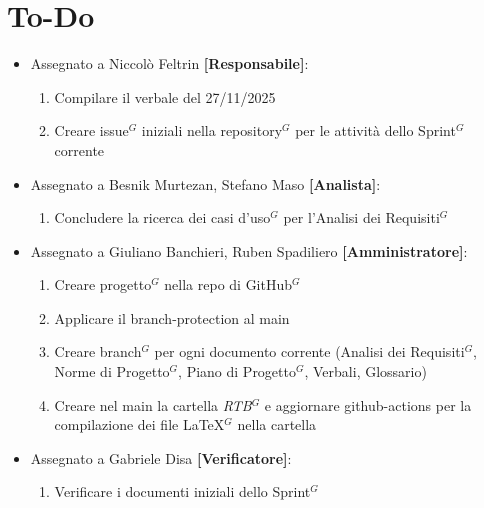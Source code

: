 \documentclass[a4paper,10pt]{article}
\begin{document}
\newpage

\section*{To-Do}
\begin{itemize}
    \item Assegnato a Niccolò Feltrin \textbf{[Responsabile]}:
    \begin{enumerate}
        \item Compilare il verbale del 27/11/2025
        \item Creare issue$^G$ iniziali nella repository$^G$ per le attività dello Sprint$^G$ corrente \\
    \end{enumerate}
    \par
    \item Assegnato a Besnik Murtezan, Stefano Maso \textbf{[Analista]}:
    \begin{enumerate}
        \item Concludere la ricerca dei casi d'uso$^G$ per l'Analisi dei Requisiti$^G$ \\
    \end{enumerate}
    \item Assegnato a Giuliano Banchieri, Ruben Spadiliero \textbf{[Amministratore]}:
    \begin{enumerate}
        \item Creare progetto$^G$ nella repo di GitHub$^G$
        \item Applicare il branch-protection al main
        \item Creare branch$^G$ per ogni documento corrente (Analisi dei Requisiti$^G$, Norme di Progetto$^G$, Piano di Progetto$^G$, Verbali, Glossario)
        \item Creare nel main la cartella \textit{RTB$^G$} e aggiornare github-actions per la compilazione dei file LaTeX$^G$ nella cartella \\
    \end{enumerate}
    \item Assegnato a Gabriele Disa \textbf{[Verificatore]}:
    \begin{enumerate}
        \item Verificare i documenti iniziali dello Sprint$^G$
    \end{enumerate}
\end{itemize}
\end{document}
